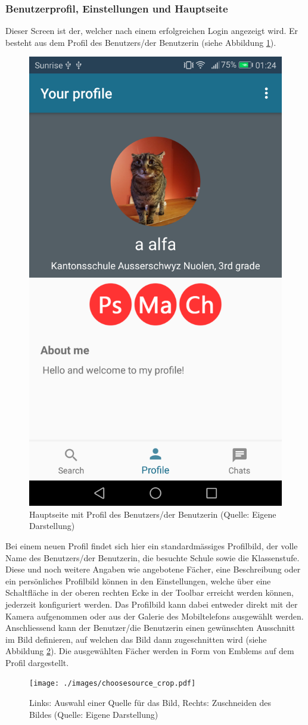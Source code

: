 \documentclass[../main.tex]{subfiles}
\begin{document}
\subsubsection*{Benutzerprofil, Einstellungen und Hauptseite} 
Dieser Screen ist der, welcher nach einem erfolgreichen Login angezeigt wird. Er besteht aus dem Profil des Benutzers/der Benutzerin (siehe Abbildung \ref{mainpage}). 
\begin{figure} 
	\centering
	\includegraphics[width=0.45\linewidth]{./images/mainpage.png}
	\caption{Hauptseite mit Profil des Benutzers/der Benutzerin (Quelle: Eigene Darstellung)}
	\label{mainpage}
\end{figure}
Bei einem neuen Profil findet sich hier ein standardmässiges Profilbild, der volle Name des Benutzers/der Benutzerin, die besuchte Schule sowie die Klassenstufe. Diese und noch weitere Angaben wie angebotene Fächer, eine Beschreibung oder ein persönliches Profilbild können in den Einstellungen, welche über eine Schaltfläche in der oberen rechten Ecke in der Toolbar erreicht werden können, jederzeit konfiguriert werden. Das Profilbild kann dabei entweder direkt mit der Kamera aufgenommen oder aus der Galerie des Mobiltelefons ausgewählt werden. Anschliessend kann der Benutzer/die Benutzerin einen gewünschten Ausschnitt im Bild definieren, auf welchen das Bild dann zugeschnitten wird (siehe Abbildung \ref{choose_crop}). Die ausgewählten Fächer werden in Form von Emblems auf dem Profil dargestellt.
\begin{figure} 
	\centering
	\texttt{[image: ./images/choosesource\_crop.pdf]}
	\caption{Links: Auswahl einer Quelle für das Bild, Rechts: Zuschneiden des Bildes (Quelle: Eigene Darstellung)}
	\label{choose_crop}
\end{figure}
\end{document}
